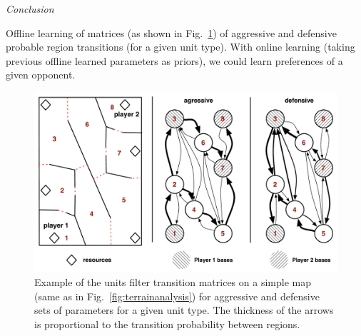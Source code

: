 \vspace{0.3cm}
\textit{Conclusion}\\
\vspace{0.3cm}

Offline learning of matrices (as shown in Fig.~\ref{fig:examplefilter}) of aggressive and defensive probable region transitions (for a given unit type). With online learning (taking previous offline learned parameters as priors), we could learn preferences of a given opponent.

\begin{figure}
\begin{center}
\includegraphics[width=15cm]{images/units_filter_markov.pdf}
\caption{Example of the units filter transition matrices on a simple map (same as in Fig.~\ref{fig:terrainanalysis}) for aggressive and defensive sets of parameters for a given unit type. The thickness of the arrows is proportional to the transition probability between regions.}
\label{fig:examplefilter}
\end{center}
\end{figure}

